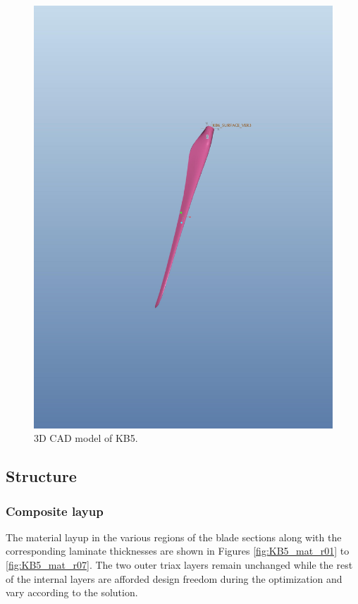 \begin{figure}[pht]
\begin{center}
	\includegraphics[width=.85\linewidth]{figures/KB6_final/KB5_surface_ver3.pdf}
\end{center}
\caption{3D CAD model of KB5.}
\label{fig:KB5_3D_blade}
\end{figure}

\subsection{Structure}
\label{subsec:KB5_structure}

\subsubsection*{Composite layup}
The material layup in the various regions of the blade sections along with the corresponding laminate thicknesses are shown in Figures \ref{fig:KB5_mat_r01} to \ref{fig:KB5_mat_r07}. The two outer triax layers remain unchanged while the rest of the internal layers are afforded design freedom during the optimization and vary according to the solution. 

